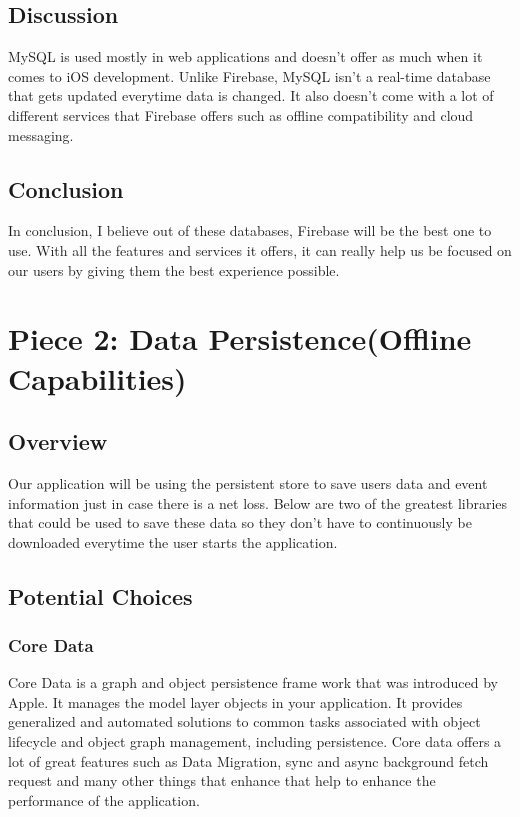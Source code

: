 \documentclass[onecolumn, draftclsnofoot,10pt, compsoc]{IEEEtran}
\begin{document}
\subsection{Discussion}
MySQL is used mostly in web applications and doesn't offer as much when it comes to iOS development. Unlike Firebase, MySQL isn't a real-time database that gets updated everytime data is changed. It also doesn't come with a lot of different services that Firebase offers such as offline compatibility and cloud messaging.
\subsection{Conclusion}
In conclusion, I believe out of these databases, Firebase will be the best one to use. With all the features and services it offers, it can really help us be focused on our users by giving them the best experience possible. 

\section{Piece 2: Data Persistence(Offline Capabilities)}
\subsection{Overview}
Our application will be using the persistent store to save users data and event information just in case there is a net loss. Below are two of the greatest libraries that could be used to save these data so they don't have to continuously be downloaded everytime the user starts the application.

\subsection{Potential Choices}
\subsubsection{Core Data}
\par Core Data is a graph and object persistence frame work that was introduced by Apple. It manages the model layer objects in your application. It provides generalized and automated solutions to common tasks associated with object lifecycle and object graph management, including persistence. Core data offers a lot of great features such as Data Migration, sync and async background fetch request and many other things that enhance that help to enhance the performance of the application.
\end{document}
